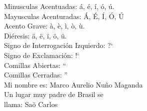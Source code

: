 \documentclass{book}
\begin{document}
Minusculas Acentuadas: \'a, \'e, \'i, \'o, \'u. \\
Mayusculas Acenturadas: \'A, \'E, \'I, \'O, \'U \\
Acento Grave: \`a, \`e, \`i, \`o, \`u. \\
Di\'eresis: \"a, \"e, \"i, \"o, \"u. \\
Signo de Interrogaci\'on Izquierdo: ?` \\
Signo de Exclamaci\'on: !` \\
Comillas Abiertas: `` \\
Comillas Cerradas: '' \\
Mi nombre es: Marco Aurelio Nu\~no Maganda \\ 
Un lugar muy padre de Brasil se \\ 
llama: Sa\~o Carlos \\
\end{document}
